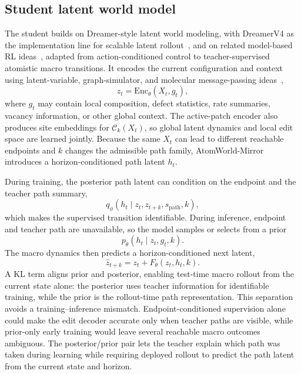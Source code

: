 \documentclass{article}
\begin{document}
\subsection{Student latent world model}

The student builds on Dreamer-style latent world modeling, with DreamerV4 as the implementation line for scalable latent rollout~\cite{hafner2019planet,hafner2020dreamer,hafner2021dreamerv2,hafner2025dreamer4}, and on related model-based RL ideas~\cite{deisenroth2011pilco,nagabandi2018neuralmb,chua2018pets,janner2019mbpo,kaiser2020atari}, adapted from action-conditioned control to teacher-supervised atomistic macro transitions. It encodes the current configuration and context using latent-variable, graph-simulator, and molecular message-passing ideas~\cite{kingma2014vae,battaglia2016interaction,sanchez2018physics,kipf2018nri,sanchez2020learning,pfaff2021meshgraphnets,gilmer2017mpnn,kipf2017gcn,velickovic2018gat,xu2019gin,gasteiger2020dimenet,satorras2021egnn,fuchs2020se3},
\begin{equation}
z_t=\mathrm{Enc}_\theta(X_t,g_t),
\end{equation}
where $g_t$ may contain local composition, defect statistics, rate summaries, vacancy information, or other global context. The active-patch encoder also produces site embeddings for $\mathcal{C}_k(X_t)$, so global latent dynamics and local edit space are learned jointly. Because the same $X_t$ can lead to different reachable endpoints and $k$ changes the admissible path family, AtomWorld-Mirror introduces a horizon-conditioned path latent $h_t$.

During training, the posterior path latent can condition on the endpoint and the teacher path summary,
\begin{equation}
q_\phi(h_t\mid z_t,z_{t+k},s_{\mathrm{path}},k),
\end{equation}
which makes the supervised transition identifiable. During inference, endpoint and teacher path are unavailable, so the model samples or selects from a prior
\begin{equation}
p_\theta(h_t\mid z_t,g_t,k).
\end{equation}
The macro dynamics then predicts a horizon-conditioned next latent,
\begin{equation}
\hat{z}_{t+k}=z_t+F_\theta(z_t,h_t,k).
\end{equation}
A KL term aligns prior and posterior, enabling test-time macro rollout from the current state alone: the posterior uses teacher information for identifiable training, while the prior is the rollout-time path representation.
This separation avoids a training--inference mismatch. Endpoint-conditioned supervision alone could make the edit decoder accurate only when teacher paths are visible, while prior-only early training would leave several reachable macro outcomes ambiguous. The posterior/prior pair lets the teacher explain which path was taken during learning while requiring deployed rollout to predict the path latent from the current state and horizon.
\end{document}
